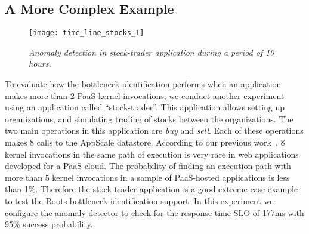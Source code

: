 
\subsection{A More Complex Example}

\begin{figure}
\centering
\texttt{[image: time\_line\_stocks\_1]}
\vspace{-0.3in}
\caption{\textit{Anomaly detection in stock-trader application during a period of 10 hours. 
}}
\vspace{-0.2in}
\label{fig:time_line_stocks_1}
\end{figure}


To evaluate how the bottleneck identification performs when an application makes more than 2
PaaS kernel invocations, we conduct another experiment using an application
called ``stock-trader''.
This application allows setting up organizations, and simulating trading of stocks between the
organizations. The two main operations in this application are \textit{buy} and \textit{sell}. Each of
these operations makes 8 calls to the AppScale datastore. 
According to our previous work~\cite{Jayathilaka:2015:RTS:2806777.2806842}, 8 kernel invocations in the
same path of execution is very rare in web applications developed for a PaaS cloud. The probability
of finding an execution path with more than 5 kernel invocations in a sample of PaaS-hosted
applications is less than 1\%. Therefore the stock-trader application is a good extreme case
example to test the Roots bottleneck identification support.
In this experiment we configure the anomaly
detector to check for the response time SLO of 177ms with 95\% success probability.

